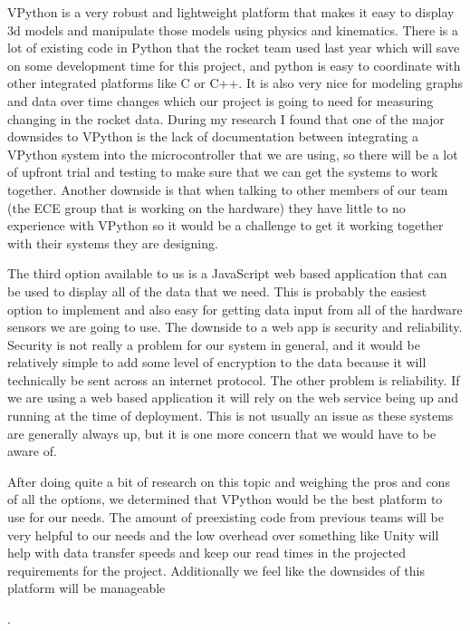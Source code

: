 \documentclass[10pt,draftclsnofoot,onecolumn]{IEEEtran}
\begin{document}
VPython is a very robust and lightweight platform that makes it easy to display 3d models and manipulate those models using physics and kinematics. There is a lot of existing code in Python that the rocket team used last year which will save on some development time for this project, and python is easy to coordinate with other integrated platforms like C or C++. It is also very nice for modeling graphs and data over time changes which our project is going to need for measuring changing in the rocket data. During my research I found that one of the major downsides to VPython is the lack of documentation between integrating a VPython system into the microcontroller that we are using, so there will be a lot of upfront trial and testing to make sure that we can get the systems to work together. Another downside is that when talking to other members of our team (the ECE group that is working on the hardware) they have little to no experience with VPython so it would be a challenge to get it working together with their systems they are designing.\par

The third option available to us is a JavaScript web based application that can be used to display all of the data that we need. This is probably the easiest option to implement and also easy for getting data input from all of the hardware sensors we are going to use. The downside to a web app is security and reliability. Security is not really a problem for our system in general, and it would be relatively simple to add some level of encryption to the data because it will technically be sent across an internet protocol. The other problem is reliability. If we are using a web based application it will rely on the web service being up and running at the time of deployment. This is not usually an issue as these systems are generally always up, but it is one more concern that we would have to be aware of.\par

After doing quite a bit of research on this topic and weighing the pros and cons of all the options, we determined that VPython would be the best platform to use for our needs. The amount of preexisting code from previous teams will be very helpful to our needs and the low overhead over something like Unity will help with data transfer speeds and keep our read times in the projected requirements for the project. Additionally we feel like the downsides of this platform will be manageable\par.
\end{document}
